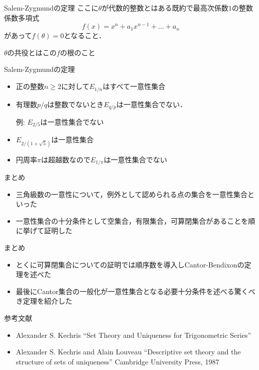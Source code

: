 \documentclass[dvipdfmx,17pt]{beamer}
\theoremstyle{plain}
\begin{document}
\begin{frame}{Salem-Zygmundの定理}
ここに$\theta$が代数的整数とはある既約で最高次係数$1$の整数係数多項式
\[f(x) = x^n + a_1 x^{n-1} + \dots + a_n\]
があって$f(\theta) = 0$となること．

$\theta$の共役とはこの$f$の根のこと
\end{frame}

\begin{frame}{Salem-Zygmundの定理}
\begin{itemize}
\item  正の整数$n\ge2$に対して$E_{1/n}$はすべて一意性集合

\item  有理数$p/q$は整数でないとき$E_{q/p}$は一意性集合でない．

例: $E_{2/5}$は一意性集合でない

\item  $E_{2/(1+\sqrt{5})}$は一意性集合

\item  円周率$\pi$は超越数なので$E_{1/\pi}$は一意性集合でない
\end{itemize}

\end{frame}


\begin{frame}{まとめ}
\begin{itemize}
\item 三角級数の一意性について，例外として認められる点の集合を一意性集合といった
\item 一意性集合の十分条件として空集合，有限集合，可算閉集合があることを順に挙げて証明した
\end{itemize}
\end{frame}

\begin{frame}{まとめ}
\begin{itemize}
\item とくに可算閉集合についての証明では順序数を導入しCantor-Bendixonの定理を述べた
\item 最後にCantor集合の一般化が一意性集合となる必要十分条件を述べる驚くべき定理を紹介した
\end{itemize}
\end{frame}


\begin{frame}{参考文献}
\begin{itemize}
\item Alexander S. Kechris “Set Theory and Uniqueness for Trigonometric Series”
\item Alexander S. Kechris and Alain Louveau “Descriptive set theory and the structure of sets of uniqueness” Cambridge University Press, 1987
\end{itemize}
\end{frame}
\end{document}
